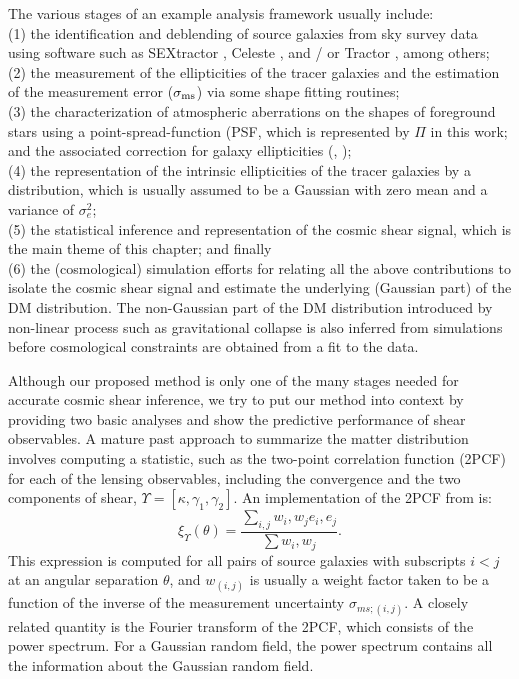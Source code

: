 The various stages of an example analysis framework usually include: \\ 
(1) the identification and deblending of source galaxies from sky survey data 
using software such as {\sc SEXtractor} \citep{Bertin1996}, {\sc Celeste}
\citep{Regier2014}, and / or {\sc Tractor} \citep{Lang2010}, among others;\\
(2) the measurement of the ellipticities of the tracer galaxies  
and the estimation of the measurement error ($\sigma_{\rm
ms}$) via some shape fitting routines; \\
(3) the characterization of atmospheric aberrations  
on the shapes of foreground stars using
 a point-spread-function (PSF, which is represented by $\Pi$ in this work;
and the associated correction for galaxy ellipticities  
(\citealt{Jee2013a}, \citealt{Rowe2010}); \\
(4) the representation of the intrinsic ellipticities of the tracer galaxies by a
distribution, which is usually assumed to be a Gaussian with zero mean
and a variance of $\sigma_e^2$;\\ 
(5) the statistical inference and representation of the cosmic shear signal,
which is the main theme of this chapter;
and finally \\
(6) the (cosmological) simulation efforts 
for relating all the above contributions to isolate the cosmic shear signal and
estimate the underlying (Gaussian part) of the DM distribution. 
The non-Gaussian part of the DM distribution introduced by non-linear process
such as gravitational collapse is also inferred from simulations before    
 cosmological constraints are obtained from a fit to the data. 

Although our proposed method is only one of the many stages needed for accurate 
cosmic shear inference, we try to put our method into context by providing two
basic analyses and show the predictive performance of shear observables.  
A mature past approach to summarize the matter distribution 
involves computing a statistic, such
as the two-point correlation function (2PCF) for each of the lensing
observables, including the convergence and the two components of shear, $\Upsilon = [\kappa, \gamma_1, \gamma_2]$. 
An implementation of the 2PCF from \cite{Jee2013a} is: 
\begin{equation}
	\xi_\Upsilon(\theta) = \frac{\sum_{i,j}w_i, w_j e_i, e_j}{\sum w_i, w_j}.
	\label{eqn:2PCF}
\end{equation}
This expression is computed 
for all pairs of source galaxies with subscripts $i < j$ at an angular separation 
$\theta$, and $w_{(i, j)}$ is usually
a weight factor taken to be a function of 
the inverse of the measurement uncertainty $\sigma_{ms; (i, j)}$.  
A closely related quantity is the Fourier transform of the 2PCF, which consists
of the power spectrum. For a Gaussian random field, the power spectrum contains
all the information about the Gaussian random field.

